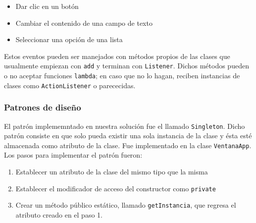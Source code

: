  \begin{itemize}
      \item Dar clic en un botón
      \item Cambiar el contenido de una campo de texto
      \item Seleccionar una opción de una lista
  \end{itemize}

  Estos eventos pueden ser manejados con métodos propios de las clases que usualmente empiezan con \texttt{add} y terminan con
  \texttt{Listener}. Dichos métodos pueden o no aceptar funciones \texttt{lambda}; en caso que no lo hagan, reciben instancias de clases
  como \texttt{ActionListener} o parececidas.

\subsubsection*{Patrones de diseño}
El patrón implememntado en nuestra solución fue el llamado \texttt{Singleton}. Dicho patrón consiste en que solo pueda existir una sola
instancia de la clase y ésta esté almacenada como atributo de la clase. Fue implementado en la clase \texttt{VentanaApp}. Los pasos para implementar el patrón fueron:
\begin{enumerate}
    \item Establecer un atributo de la clase del mismo tipo que la misma
    \item Establecer el modificador de acceso del constructor como \texttt{private}
    \item Crear un método público estático, llamado \texttt{getInstancia}, que regresa el atributo creado en el paso 1.
\end{enumerate}